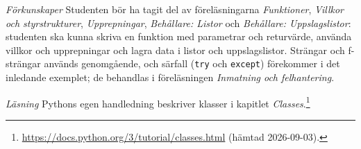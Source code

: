 \emph{Förkunskaper}
Studenten bör ha tagit del av föreläsningarna \emph{Funktioner},
\emph{Villkor och styrstrukturer}, \emph{Upprepningar}, \emph{Behållare:
Listor} och \emph{Behållare: Uppslagslistor}: studenten ska kunna skriva
en funktion med parametrar och returvärde, använda villkor och
upprepningar och lagra data i listor och uppslagslistor.  Strängar och
f-strängar används genomgående, och särfall
(\texttt{try} och \texttt{except}) förekommer i
det inledande exemplet; de behandlas i föreläsningen \emph{Inmatning
och felhantering}.

\emph{Läsning}
Pythons egen handledning beskriver klasser i kapitlet
\emph{Classes}.\footnote{\label{fn:pydoc-classes}%
  \url{https://docs.python.org/3/tutorial/classes.html} (hämtad
  2026-09-03).}
